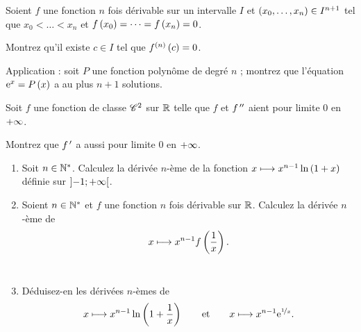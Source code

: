 \begin{exoss}
Soient \(f\) une fonction \(n\) fois dérivable sur un intervalle \(I\) et \(\left(x_0,\dots,x_n\right)\in I^{n+1}\) tel que \(x_0<\dots<x_n\) et \(f\left(x_0\right)=\dots=f\left(x_n\right)=0\).

Montrez qu'il existe \(c\in I\) tel que \(f^{\left(n\right)}\left(c\right)=0\).

Application : soit \(P\) une fonction polynôme de degré \(n\) ; montrez que l'équation \(\mathrm{e}^{x}=P\left(x\right)\) a au plus \(n+1\) solutions.
\end{exoss}

\begin{exoss}
Soit \(f\) une fonction de classe \(\mathscr{C}^{2}\) sur \(\mathbb{R}\) telle que \(f\) et \(f^{\,\prime\prime}\) aient pour limite \(0\) en \(+\infty\).

Montrez que \(f^{\,\prime}\) a aussi pour limite \(0\) en \(+\infty\).
\end{exoss}

\begin{exoss}
\begin{enumerate}
    \item Soit \(n\in\mathbb{N}^*\). Calculez la dérivée \(n\)-ème de la fonction \(x\longmapsto x^{n-1}\ln\left(1+x\right)\) définie sur \(\left]-1;+\infty\right[\). \\
    \item Soient \(n\in\mathbb{N}^*\) et \(f\) une fonction \(n\) fois dérivable sur \(\mathbb{R}\). Calculez la dérivée \(n\)-ème de \[x\longmapsto x^{n-1}f\left(\dfrac{1}{x}\right).\] \\
    \item Déduisez-en les dérivées \(n\)-èmes de \[x\longmapsto x^{n-1}\ln\left(1+\dfrac{1}{x}\right)\qquad\text{et}\qquad x\longmapsto x^{n-1}\mathrm{e}^{\nicefrac{1}{x}}.\]
\end{enumerate}
\end{exoss}

